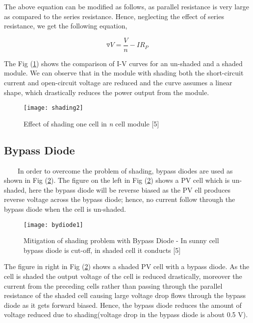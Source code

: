 The above equation can be modified as follows, as parallel resistance is very large as compared to the series resistance. Hence, neglecting the effect of series resistance, we get the following equation, 

\begin{equation}
\label{shade4}
\triangledown V=\frac{V}{n}-IR_{P}
\end{equation}

The Fig (\ref{figc3h999}) shows the comparison of I-V curves for an un-shaded and a shaded module. We can observe that in the module with shading both the short-circuit current and open-circuit voltage are reduced and the curve assumes a linear shape, which drastically reduces the power output from the module.

\begin{figure}[H]
\centering
\texttt{[image: shading2]}
\caption{Effect of shading one cell in \textit{n} cell module [5]}
\label{figc3h999} %
\end{figure}

\newpage

\subsection{Bypass Diode}
\
\
\
\
In order to overcome the problem of shading, bypass diodes are used as shown in Fig (\ref{figc3h100}). The figure on the left in Fig (\ref{figc3h100}) shows a PV cell which is un-shaded, here the bypass diode will be reverse biased as the PV ell produces reverse voltage across the bypass diode; hence, no current follow through the bypass diode when the cell is un-shaded.

\begin{figure}[H]
\centering
\texttt{[image: bydiode1]}
\caption{Mitigation of shading problem with Bypass Diode - In sunny cell bypass diode is cut-off, in shaded cell it conducts [5]}
\label{figc3h100} %
\end{figure}

The figure in right in Fig (\ref{figc3h100}) shows a shaded PV cell with a bypass diode. As the cell is shaded the output voltage of the cell is reduced drastically, moreover the current from the preceding cells rather than passing through the parallel resistance of the shaded cell causing large voltage drop flows through the bypass diode as it gets forward biased. Hence, the bypass diode reduces the amount of voltage reduced due to shading(voltage drop in the bypass diode is about 0.5 V).


